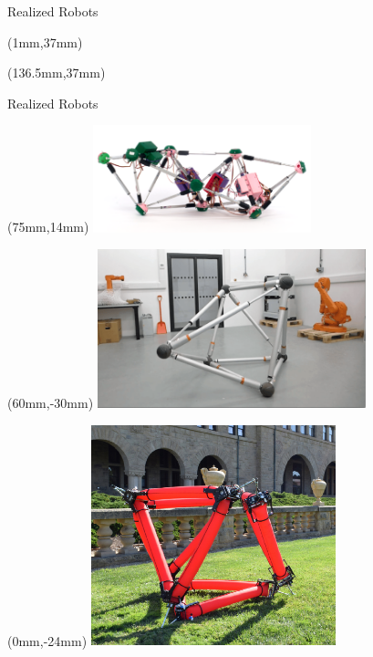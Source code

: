 \documentclass[11pt,aspectratio=169]{beamer}
\begin{document}
\begin{frame}[fragile]{Realized Robots}
        \begin{textblock*}{5cm}(1mm,37mm) %
        {\color{white} \tiny \cite{Guan}}
        \end{textblock*}

        \begin{textblock*}{5cm}(136.5mm,37mm) %
        {\color{white} \tiny \cite{extended}}
        \end{textblock*}
 
\end{frame}

\begin{frame}[fragile]{Realized Robots}

        \begin{textblock*}{8cm}(75mm,14mm) %
        \includegraphics[height=31mm]{elements/[6]-R5.png}
        \end{textblock*} 
        
        \begin{textblock*}{8cm}(60mm,-30mm) %
        {\color{white}\href{https://youtu.be/1dMpeTp2ZrM}{\includegraphics[height=46mm]{elements/[5]-R4.png}}}
        \end{textblock*}
    
        \begin{textblock*}{5cm}(0mm,-24mm) %
        \includegraphics[height=64mm]{elements/[4]-R3.png}
        \end{textblock*}


\end{frame}
\end{document}
